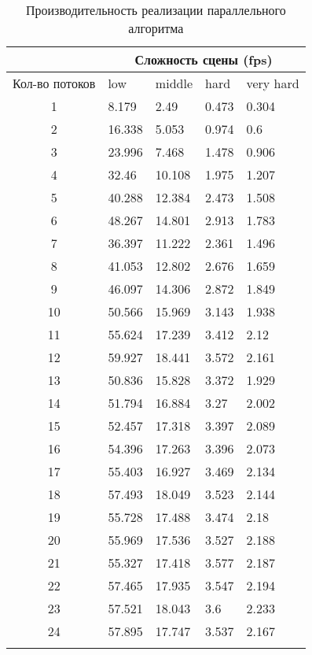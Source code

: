\begin{center}
\begin{longtable}{|c|p{2cm}|p{2cm}|p{2cm}|p{2cm}|}
\hline & \multicolumn{4}{c|}{Сложность сцены (fps)} \\ 
\hline Кол-во потоков & low & middle & hard &  very hard\\ 
\hline 1 &  8.179 & 2.49 & 0.473 & 0.304 \\ 
\hline 2 &  16.338 & 5.053 & 0.974 & 0.6 \\ 
\hline 3 &  23.996 & 7.468 & 1.478 & 0.906 \\ 
\hline 4 &  32.46 & 10.108 & 1.975 & 1.207 \\ 
\hline 5 &  40.288 & 12.384 & 2.473 & 1.508 \\ 
\hline 6 &  48.267 & 14.801 & 2.913 & 1.783 \\ 
\hline 7 &  36.397 & 11.222 & 2.361 & 1.496 \\ 
\hline 8 &  41.053 & 12.802 & 2.676 & 1.659 \\ 
\hline 9 &  46.097 & 14.306 & 2.872 & 1.849 \\ 
\hline 10 &  50.566 & 15.969 & 3.143 & 1.938 \\ 
\hline 11 &  55.624 & 17.239 & 3.412 & 2.12 \\ 
\hline 12 &  59.927 & 18.441 & 3.572 & 2.161 \\ 
\hline 13 &  50.836 & 15.828 & 3.372 & 1.929 \\ 
\hline 14 &  51.794 & 16.884 & 3.27 & 2.002 \\ 
\hline 15 &  52.457 & 17.318 & 3.397 & 2.089 \\ 
\hline 16 &  54.396 & 17.263 & 3.396 & 2.073 \\ 
\hline 17 &  55.403 & 16.927 & 3.469 & 2.134 \\ 
\hline 18 &  57.493 & 18.049 & 3.523 & 2.144 \\ 
\hline 19 &  55.728 & 17.488 & 3.474 & 2.18 \\ 
\hline 20 &  55.969 & 17.536 & 3.527 & 2.188 \\ 
\hline 21 &  55.327 & 17.418 & 3.577 & 2.187 \\ 
\hline 22 &  57.465 & 17.935 & 3.547 & 2.194 \\ 
\hline 23 &  57.521 & 18.043 & 3.6 & 2.233 \\ 
\hline 24 &  57.895 & 17.747 & 3.537 & 2.167 \\ 
\hline
\caption{Производительность реализации параллельного алгоритма}\label{tab:perf_parallel_alg}\end{longtable}
\end{center}

